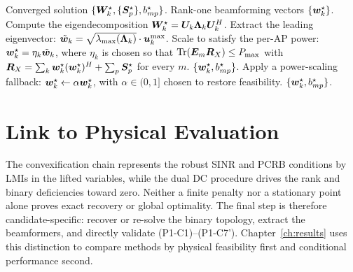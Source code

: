 \begin{algorithm}[htbp]
\caption{Rank-One Beamforming Extraction (Baseline Post-Processing)}
\label{alg:rank1}
\begin{algorithmic}[1]
\Require Converged solution $\{\bm{W}_k^\star, \{\bm{S}_p^\star\}, b_{mp}^\star\}$.
\Ensure Rank-one beamforming vectors $\{\bm{w}_k^\star\}$.
    \State Compute the eigendecomposition $\bm{W}_k^\star = \bm{U}_k \bm{\Lambda}_k \bm{U}_k^H$.
    \State Extract the leading eigenvector: $\tilde{\bm{w}}_k = \sqrt{\lambda_{\max}(\bm{\Lambda}_k)} \cdot \bm{u}_k^{\max}$.
    \State Scale to satisfy the per-AP power: $\bm{w}_k^\star = \eta_k \tilde{\bm{w}}_k$, where $\eta_k$ is chosen so that $\operatorname{Tr}(\bm{E}_m \bm{R}_X) \leq P_{\max}$ with $\bm{R}_X = \sum_k \bm{w}_k^\star (\bm{w}_k^\star)^H + \sum_p \bm{S}_p^\star$ for every $m$.
\EndFor
{}
    \State \Return $\{\bm{w}_k^\star, b_{mp}^\star\}$.
\Else
    \State Apply a power-scaling fallback: $\bm{w}_k^\star \leftarrow \alpha \bm{w}_k^\star$, with $\alpha \in (0, 1]$ chosen to restore feasibility.
    \State \Return $\{\bm{w}_k^\star, b_{mp}^\star\}$.
\EndIf
\end{algorithmic}
\end{algorithm}

\section{Link to Physical Evaluation}\label{sec:solution_to_results}

The convexification chain represents the robust SINR and PCRB conditions by
LMIs in the lifted variables, while the dual DC procedure drives the rank and
binary deficiencies toward zero. Neither a finite penalty nor a stationary
point alone proves exact recovery or global optimality. The final step is
therefore candidate-specific: recover or re-solve the binary topology, extract
the beamformers, and directly validate (P1-C1)--(P1-C7').
Chapter~\ref{ch:results} uses this distinction to compare methods by physical
feasibility first and conditional performance second.
